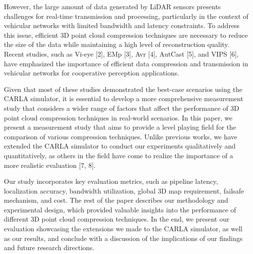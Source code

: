 \documentclass[conference]{IEEEtran}
\begin{document}
However, the large amount of data generated by LiDAR sensors presents challenges for real-time transmission and processing, particularly in the context of vehicular networks with limited bandwidth and latency constraints. To address this issue, efficient 3D point cloud compression techniques are necessary to reduce the size of the data while maintaining a high level of reconstruction quality. Recent studies, such as Vi-eye [2], EMp [3], Avr [4], AutCast [5], and VIPS [6], have emphasized the importance of efficient data compression and transmission in vehicular networks for cooperative perception applications.

Given that most of these studies demonstrated the best-case scenarios using the CARLA simulator, it is essential to develop a more comprehensive measurement study that considers a wider range of factors that affect the performance of 3D point cloud compression techniques in real-world scenarios. In this paper, we present a measurement study that aims to provide a level playing field for the comparison of various compression techniques. Unlike previous works, we have extended the CARLA simulator to conduct our experiments qualitatively and quantitatively, as others in the field have come to realize the importance of a more realistic evaluation [7, 8].

Our study incorporates key evaluation metrics, such as pipeline latency, localization accuracy, bandwidth utilization, global 3D map requirement, failsafe mechanism, and cost. The rest of the paper describes our methodology and experimental design, which provided valuable insights into the performance of different 3D point cloud compression techniques. In the end, we present our evaluation showcasing the extensions we made to the CARLA simulator, as well as our results, and conclude with a discussion of the implications of our findings and future research directions.

\end{document}
